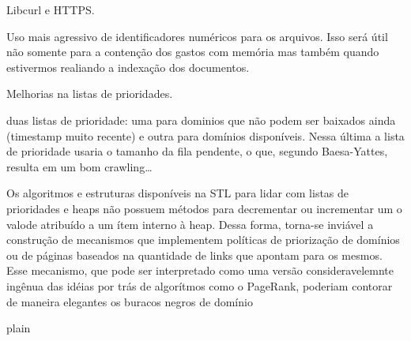 \documentclass[10pt,twocolumn]{article}
\begin{document}
Libcurl e HTTPS.

Uso mais agressivo de identificadores numéricos para os arquivos. Isso será
útil não somente para a contenção dos gastos com memória mas também quando
estivermos realiando a indexação dos documentos.

Melhorias na listas de prioridades.

duas listas de prioridade: uma para dominios que não podem ser baixados
ainda (timestamp muito recente) e outra para domínios disponíveis. Nessa
última a lista de prioridade usaria o tamanho da fila pendente, o que,
segundo Baesa-Yattes, resulta em um bom crawling\ldots

 Os algoritmos e estruturas disponíveis na
STL para lidar com listas de prioridades e heaps não possuem métodos para
decrementar ou incrementar um o valode atribuído a um ítem interno à heap.
Dessa forma, torna-se inviável a construção de mecanismos que implementem
políticas de priorização de domínios ou de páginas baseados na quantidade de
links que apontam para os mesmos. Esse mecanismo, que pode ser interpretado
como uma versão consideravelemnte ingênua das idéias por trás de algorítmos
como o PageRank, poderiam contorar de maneira elegantes os buracos negros de
domínio

\nocite{stroustrup97}
 {plain}

\end{document}
